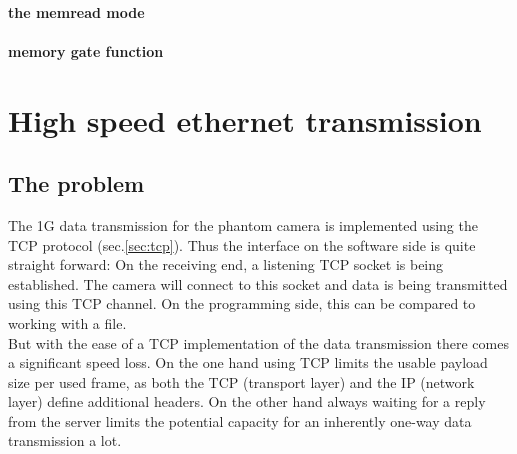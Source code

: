\paragraph{the memread mode}

\paragraph{memory gate function}

\section{High speed ethernet transmission}

\subsection{The problem}

The 1G data transmission for the phantom camera is implemented using the TCP protocol (sec.\ref{sec:tcp}). Thus the interface on the software side is quite straight forward: On the receiving end, a listening TCP socket is being established. The camera will connect to this socket and data is being transmitted using this TCP channel. On the programming side, this can be compared to working with a file.\\
But with the ease of a TCP implementation of the data transmission there comes a significant speed loss. On the one hand using TCP limits the usable payload size per used frame, as both the TCP (transport layer) and the IP (network layer) define additional headers. On the other hand always waiting for a reply from the server limits the potential capacity for an inherently one-way data transmission a lot.\par 

